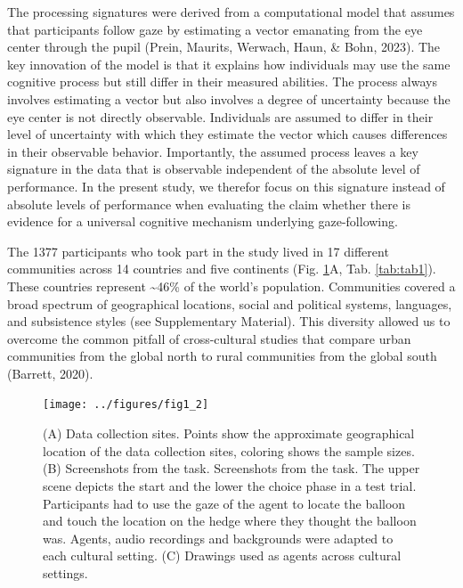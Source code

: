 \documentclass[
  man,floatsintext]{apa6}
\begin{document}
The processing signatures were derived from a computational model that assumes that participants follow gaze by estimating a vector emanating from the eye center through the pupil (Prein, Maurits, Werwach, Haun, \& Bohn, 2023). The key innovation of the model is that it explains how individuals may use the same cognitive process but still differ in their measured abilities. The process always involves estimating a vector but also involves a degree of uncertainty because the eye center is not directly observable. Individuals are assumed to differ in their level of uncertainty with which they estimate the vector which causes differences in their observable behavior. Importantly, the assumed process leaves a key signature in the data that is observable independent of the absolute level of performance. In the present study, we therefor focus on this signature instead of absolute levels of performance when evaluating the claim whether there is evidence for a universal cognitive mechanism underlying gaze-following.

The 1377 participants who took part in the study lived in 17 different communities across 14 countries and five continents (Fig. \ref{fig:fig1}A, Tab. \ref{tab:tab1}). These countries represent \textasciitilde46\% of the world's population. Communities covered a broad spectrum of geographical locations, social and political systems, languages, and subsistence styles (see Supplementary Material). This diversity allowed us to overcome the common pitfall of cross-cultural studies that compare urban communities from the global north to rural communities from the global south (Barrett, 2020).

\begin{figure}

{\centering \texttt{[image: ../figures/fig1\_2]} 

}

\caption{(A) Data collection sites. Points show the approximate geographical location of the data collection sites, coloring shows the sample sizes. (B) Screenshots from the task. Screenshots from the task. The upper scene depicts the start and the lower the choice phase in a test trial. Participants had to use the gaze of the agent to locate the balloon and touch the location on the hedge where they thought the balloon was. Agents, audio recordings and backgrounds were adapted to each cultural setting. (C) Drawings used as agents across cultural settings.}\label{fig:fig1}
\end{figure}
\end{document}

